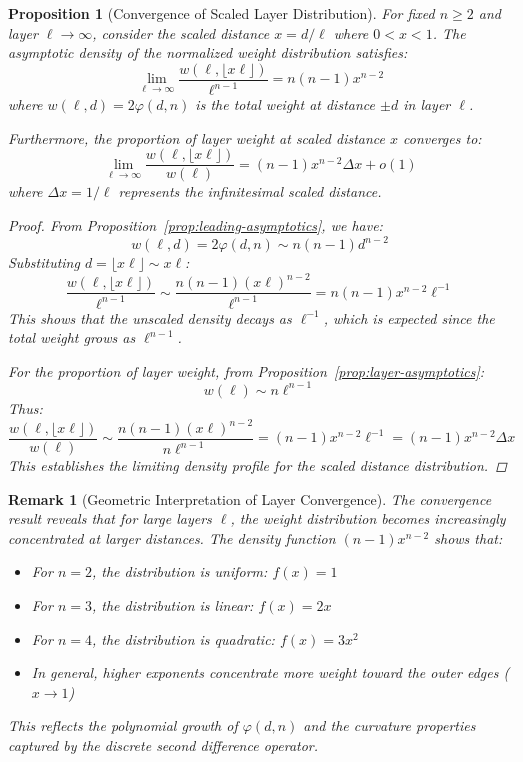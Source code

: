 \documentclass[11pt]{article}
\newtheorem{proposition}[definition]{Proposition}
\newtheorem{remark}[definition]{Remark}
\begin{document}
\begin{proposition}[Convergence of Scaled Layer Distribution]\label{prop:layer-convergence}
For fixed $n \geq 2$ and layer $\ell \to \infty$, consider the scaled distance $x = d/\ell$ where $0 < x < 1$. The asymptotic density of the normalized weight distribution satisfies:
\[
\lim_{\ell \to \infty} \frac{w(\ell, \lfloor x\ell \rfloor)}{\ell^{n-1}} = n(n-1)x^{n-2}
\]
where $w(\ell,d) = 2\varphi(d,n)$ is the total weight at distance $\pm d$ in layer $\ell$.

Furthermore, the proportion of layer weight at scaled distance $x$ converges to:
\[
\lim_{\ell \to \infty} \frac{w(\ell, \lfloor x\ell \rfloor)}{w(\ell)} = (n-1)x^{n-2}\Delta x + o(1)
\]
where $\Delta x = 1/\ell$ represents the infinitesimal scaled distance.
\begin{proof}
From Proposition~\ref{prop:leading-asymptotics}, we have:
\[
w(\ell,d) = 2\varphi(d,n) \sim n(n-1)d^{n-2}
\]
Substituting $d = \lfloor x\ell \rfloor \sim x\ell$:
\[
\frac{w(\ell, \lfloor x\ell \rfloor)}{\ell^{n-1}} \sim \frac{n(n-1)(x\ell)^{n-2}}{\ell^{n-1}} = n(n-1)x^{n-2}\ell^{-1}
\]
This shows that the unscaled density decays as $\ell^{-1}$, which is expected since the total weight grows as $\ell^{n-1}$.

For the proportion of layer weight, from Proposition~\ref{prop:layer-asymptotics}:
\[
w(\ell) \sim n\ell^{n-1}
\]
Thus:
\[
\frac{w(\ell, \lfloor x\ell \rfloor)}{w(\ell)} \sim \frac{n(n-1)(x\ell)^{n-2}}{n\ell^{n-1}} = (n-1)x^{n-2}\ell^{-1} = (n-1)x^{n-2}\Delta x
\]
This establishes the limiting density profile for the scaled distance distribution.
\end{proof}
\end{proposition}

\begin{remark}[Geometric Interpretation of Layer Convergence]\label{rem:layer-convergence}
The convergence result reveals that for large layers $\ell$, the weight distribution becomes increasingly concentrated at larger distances. The density function $(n-1)x^{n-2}$ shows that:
\begin{itemize}
\item For $n=2$, the distribution is uniform: $f(x) = 1$
\item For $n=3$, the distribution is linear: $f(x) = 2x$  
\item For $n=4$, the distribution is quadratic: $f(x) = 3x^2$
\item In general, higher exponents concentrate more weight toward the outer edges ($x \to 1$)
\end{itemize}
This reflects the polynomial growth of $\varphi(d,n)$ and the curvature properties captured by the discrete second difference operator.
\end{remark}
\end{document}
